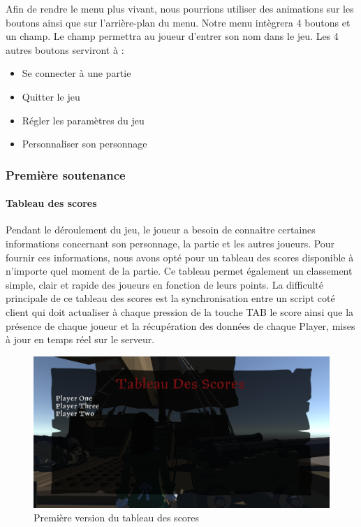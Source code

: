         Afin de rendre le menu plus vivant, 
        nous pourrions utiliser des animations sur les boutons ainsi que sur l’arrière-plan du menu. 
        Notre menu intègrera 4 boutons et un champ. Le champ permettra au joueur d’entrer son nom dans le jeu. \newline
        Les 4 autres boutons serviront à :
        \begin{itemize}
                \item Se connecter à une partie
                \item Quitter le jeu
                \item Régler les paramètres du jeu
                \item Personnaliser son personnage
        \end{itemize}


    \subsubsection{Première soutenance}
        
        \paragraph{Tableau des scores}
        Pendant le déroulement du jeu, le joueur a besoin de connaitre certaines informations concernant son personnage, la partie et les autres joueurs. 
        Pour fournir ces informations, nous avons opté pour un tableau des scores disponible à n’importe quel moment de la partie. Ce tableau permet également un classement simple, clair et rapide des joueurs en fonction de leurs points.
        La difficulté principale de ce tableau des scores est la synchronisation entre un script coté client qui doit actualiser à chaque pression de la touche TAB le score ainsi que la présence de chaque joueur et la récupération des données de chaque Player, mises à jour en temps réel sur le serveur.
        
        \begin{figure}[hbt!]
                \centering
                \includegraphics[scale=0.29]{img/scoreboard.PNG}
                \caption{Première version du tableau des scores}
        \end{figure}
        \FloatBarrier


